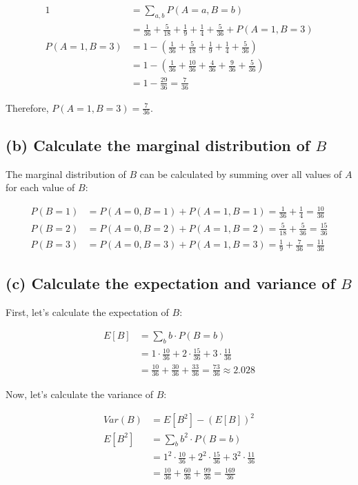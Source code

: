 \documentclass{article}
\begin{document}
\begin{align*}
1 &= \sum_{a,b} P(A=a, B=b) \\
&= \frac{1}{36} + \frac{5}{18} + \frac{1}{9} + \frac{1}{4} + \frac{5}{36} + P(A=1, B=3) \\
P(A=1, B=3) &= 1 - (\frac{1}{36} + \frac{5}{18} + \frac{1}{9} + \frac{1}{4} + \frac{5}{36}) \\
&= 1 - (\frac{1}{36} + \frac{10}{36} + \frac{4}{36} + \frac{9}{36} + \frac{5}{36}) \\
&= 1 - \frac{29}{36} = \frac{7}{36}
\end{align*}

Therefore, $P(A = 1, B = 3) = \frac{7}{36}$.

\subsection*{(b) Calculate the marginal distribution of $B$}

The marginal distribution of $B$ can be calculated by summing over all values of $A$ for each value of $B$:

\begin{align*}
P(B = 1) &= P(A = 0, B = 1) + P(A = 1, B = 1) = \frac{1}{36} + \frac{1}{4} = \frac{10}{36} \\
P(B = 2) &= P(A = 0, B = 2) + P(A = 1, B = 2) = \frac{5}{18} + \frac{5}{36} = \frac{15}{36} \\
P(B = 3) &= P(A = 0, B = 3) + P(A = 1, B = 3) = \frac{1}{9} + \frac{7}{36} = \frac{11}{36}
\end{align*}

\subsection*{(c) Calculate the expectation and variance of $B$}

First, let's calculate the expectation of $B$:

\begin{align*}
E[B] &= \sum_{b} b \cdot P(B = b) \\
&= 1 \cdot \frac{10}{36} + 2 \cdot \frac{15}{36} + 3 \cdot \frac{11}{36} \\
&= \frac{10}{36} + \frac{30}{36} + \frac{33}{36} = \frac{73}{36} \approx 2.028
\end{align*}

Now, let's calculate the variance of $B$:

\begin{align*}
Var(B) &= E[B^2] - (E[B])^2 \\
E[B^2] &= \sum_{b} b^2 \cdot P(B = b) \\
&= 1^2 \cdot \frac{10}{36} + 2^2 \cdot \frac{15}{36} + 3^2 \cdot \frac{11}{36} \\
&= \frac{10}{36} + \frac{60}{36} + \frac{99}{36} = \frac{169}{36}
\end{align*}
\end{document}
